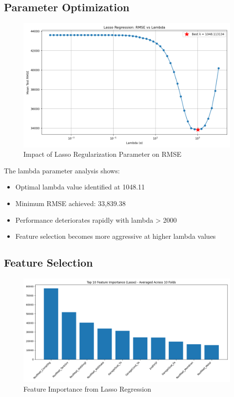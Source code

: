 \documentclass[12pt]{report}
\begin{document}
\subsection{Parameter Optimization}
\begin{figure}[H]
    \centering
    \includegraphics[width=1.0\textwidth]{figures/lasso_lambda_vs_rmse.png}
    \caption{Impact of Lasso Regularization Parameter on RMSE}
    \label{fig:lasso_lambda}
\end{figure}

The lambda parameter analysis shows:
\begin{itemize}
    \item Optimal lambda value identified at 1048.11
    \item Minimum RMSE achieved: 33,839.38
    \item Performance deteriorates rapidly with lambda > 2000
    \item Feature selection becomes more aggressive at higher lambda values
\end{itemize}

\subsection{Feature Selection}
\begin{figure}[H]
    \centering
    \includegraphics[width=1.0\textwidth]{figures/lasso_feature_importance.png}
    \caption{Feature Importance from Lasso Regression}
    \label{fig:lasso_importance}
\end{figure}
\end{document}
